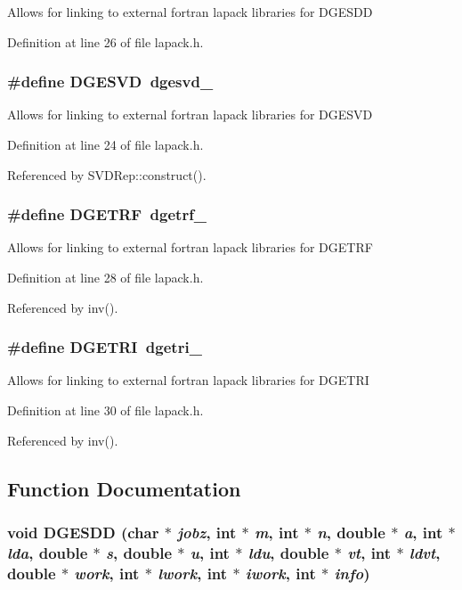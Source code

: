Allows for linking to external fortran lapack libraries for DGESDD 

Definition at line 26 of file lapack.h.
\subsubsection{\setlength{\rightskip}{0pt plus 5cm}\#define DGESVD~dgesvd\_\-}\label{lapack_8h_60ac2e59de82b829671f86267e2f945d_60ac2e59de82b829671f86267e2f945d}


Allows for linking to external fortran lapack libraries for DGESVD 

Definition at line 24 of file lapack.h.

Referenced by SVDRep::construct().
\subsubsection{\setlength{\rightskip}{0pt plus 5cm}\#define DGETRF~dgetrf\_\-}\label{lapack_8h_8232e9d246b08322be0e78d51069b338_8232e9d246b08322be0e78d51069b338}


Allows for linking to external fortran lapack libraries for DGETRF 

Definition at line 28 of file lapack.h.

Referenced by inv().
\subsubsection{\setlength{\rightskip}{0pt plus 5cm}\#define DGETRI~dgetri\_\-}\label{lapack_8h_ee2279541a5252501cb917f4f77fa465_ee2279541a5252501cb917f4f77fa465}


Allows for linking to external fortran lapack libraries for DGETRI 

Definition at line 30 of file lapack.h.

Referenced by inv().

\subsection{Function Documentation}
\subsubsection{\setlength{\rightskip}{0pt plus 5cm}void DGESDD (char $\ast$ {\em jobz}, int $\ast$ {\em m}, int $\ast$ {\em n}, double $\ast$ {\em a}, int $\ast$ {\em lda}, double $\ast$ {\em s}, double $\ast$ {\em u}, int $\ast$ {\em ldu}, double $\ast$ {\em vt}, int $\ast$ {\em ldvt}, double $\ast$ {\em work}, int $\ast$ {\em lwork}, int $\ast$ {\em iwork}, int $\ast$ {\em info})}\label{lapack_8h_3699d460f043a1c87f322e9a6efe4268_3699d460f043a1c87f322e9a6efe4268}


